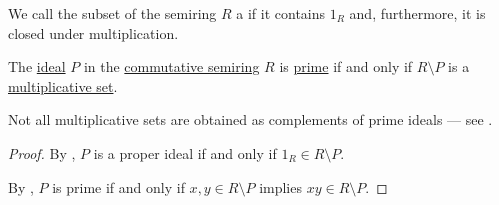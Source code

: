 \begin{definition}\label{def:multiplicative_set_in_semiring}
  We call the subset of the semiring \( R \) a  if it contains \( 1_R \) and, furthermore, it is closed under multiplication.
\end{definition}

\begin{proposition}\label{thm:complement_of_prime_ideal}
  The \hyperref[def:semiring_ideal]{ideal} \( P \) in the \hyperref[def:semiring/commutative]{commutative semiring} \( R \) is \hyperref[def:semiring_ideal/prime]{prime} if and only if \( R \setminus P \) is a \hyperref[def:multiplicative_set_in_semiring]{multiplicative set}.

  Not all multiplicative sets are obtained as complements of prime ideals --- see .
\end{proposition}
\begin{proof}
  By , \( P \) is a proper ideal if and only if \( 1_R \in R \setminus P \).

  By , \( P \) is prime if and only if \( x, y \in R \setminus P \) implies \( xy \in R \setminus P \).
\end{proof}

